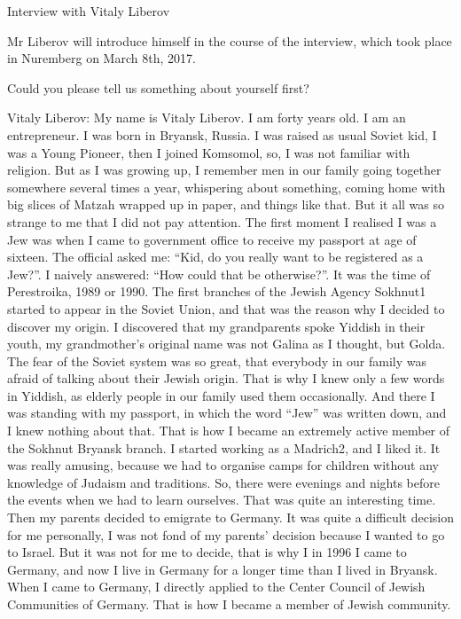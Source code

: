 Interview with Vitaly Liberov 

Mr Liberov will introduce himself in the course of the interview, which took place in Nuremberg on March 8th, 2017. 

Could you please tell us something about yourself first? 

Vitaly Liberov: My name is Vitaly Liberov. I am forty years old. I am an entrepreneur. I was born in Bryansk, Russia. I was raised as usual Soviet kid, I was a Young Pioneer, then I joined Komsomol, so, I was not familiar with religion. But as I was growing up, I remember men in our family going together somewhere several times a year, whispering about something, coming home with big slices of Matzah wrapped up in paper, and things like that. But it all was so strange to me that I did not pay attention. The first moment I realised I was a Jew was when I came to government office to receive my passport at age of sixteen. The official asked me: “Kid, do you really want to be registered as a Jew?”. I naively answered: “How could that be otherwise?”. It was the time of Perestroika, 1989 or 1990. The first branches of the Jewish Agency Sokhnut1 started to appear in the Soviet Union, and that was the reason why I decided to discover my origin. I discovered that my grandparents spoke Yiddish in their youth, my grandmother’s original name was not Galina as I thought, but Golda. The fear of the Soviet system was so great, that everybody in our family was afraid of talking about their Jewish origin. That is why I knew only a few words in Yiddish, as elderly people in our family used them occasionally. And there I was standing with my passport, in which the word “Jew” was written down, and I knew nothing about that. That is how I became an extremely active member of the Sokhnut Bryansk branch. I started working as a Madrich2, and I liked it.  It was really amusing, because we had to organise camps for children without any knowledge of Judaism and traditions. So, there were evenings and nights before the events when we had to learn ourselves. That was quite an interesting time. Then my parents decided to emigrate to Germany. It was quite a difficult decision for me personally, I was not fond of my parents’ decision because I wanted to go to Israel. But it was not for me to decide, that is why I in 1996 I came to Germany, and now I live in Germany for a longer time than I lived in Bryansk. When I came to Germany, I directly applied to the Center Council of Jewish Communities of Germany. That is how I became a member of Jewish community.  

